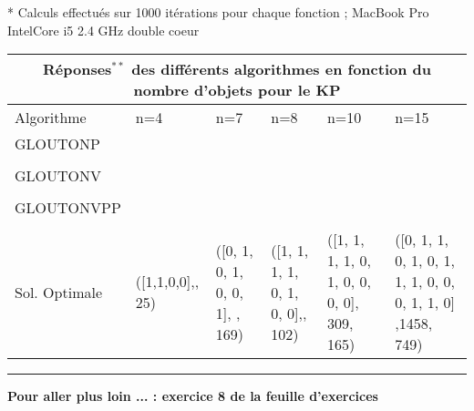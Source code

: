\documentclass[12pt,french]{article}
\begin{document}
\vspace{2mm}
* Calculs effectués sur 1000 itérations pour chaque fonction ; MacBook Pro IntelCore i5 2.4 GHz double coeur
\begin{table}[h]
	\begin{tabular}{ |p{2.5cm}|p{1.5cm}|p{2.8cm}|p{3.2cm}|p{3.6cm}|p{}| }
		\hline
		\multicolumn{6}{|c|}{Réponses$^{**}$ des différents algorithmes en fonction du nombre d'objets pour le KP} \\
		\hline
		Algorithme& n=4&n=7&n=8& n=10&n=15\\
		\hline
		GLOUTONP &&&&& \\
		&&&&& \\
		\hline
		GLOUTONV &&&&& \\
			&&&&& \\
		\hline
		GLOUTONVPP &&&&&\\
			&&&&& \\
		\hline
		Sol. Optimale  &\small([1,1,0,0],\newline11, 25)&\small ([0, 1, 0, 1, 0, 0, 1], \newline1735, 169)&\small([1, 1, 1, 1, 0, 1, 0, 0],\newline 280, 102) & \small([1, 1, 1, 1, 0, 1, 0, 0, 0, 0], 309, 165) &\small([0, 1, 1, 0, 1, 0, 1, 1, 1, 0, 0, 0, 1, 1, 0] ,1458, 749) \\
		\hline
	\end{tabular}
	
\end{table}
 
\normalsize
\hrule
\medskip
\begin{center} 
\textbf{Pour aller plus loin ... : exercice 8 de la feuille d'exercices} \end{center}
\end{document}
